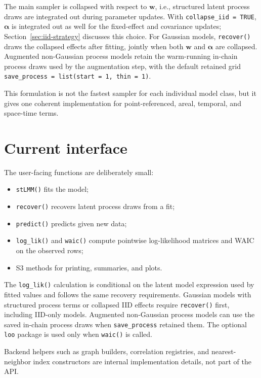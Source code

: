 \documentclass[11pt]{article}
\newcommand{\bw}{\bm{w}}
\newcommand{\balpha}{\bm{\alpha}}
\begin{document}
The main sampler is collapsed with respect to $\bw$, i.e., structured latent process draws are integrated out during parameter updates. With \texttt{collapse\_iid = TRUE}, $\balpha$ is integrated out as well for the fixed-effect and covariance updates; Section~\ref{sec:iid-strategy} discusses this choice. For Gaussian models, \texttt{recover()} draws the collapsed effects after fitting, jointly when both $\bw$ and $\balpha$ are collapsed. Augmented non-Gaussian process models retain the warm-running in-chain process draws used by the augmentation step, with the default retained grid \texttt{save\_process = list(start = 1, thin = 1)}.

This formulation is not the fastest sampler for each individual model class, but it gives one coherent implementation for point-referenced, areal, temporal, and space-time terms.

\section{Current interface}

The user-facing functions are deliberately small:
\begin{itemize}
\item \texttt{stLMM()} fits the model;
\item \texttt{recover()} recovers latent process draws from a fit;
\item \texttt{predict()} predicts given new data;
\item \texttt{log\_lik()} and \texttt{waic()} compute pointwise log-likelihood matrices and WAIC on the observed rows;
\item S3 methods for printing, summaries, and plots.
\end{itemize}

The \texttt{log\_lik()} calculation is conditional on the latent model expression used by fitted values and follows the same recovery requirements. Gaussian models with structured process terms or collapsed IID effects require \texttt{recover()} first, including IID-only models. Augmented non-Gaussian process models can use the saved in-chain process draws when \texttt{save\_process} retained them. The optional \texttt{loo} package is used only when \texttt{waic()} is called.

Backend helpers such as graph builders, correlation registries, and nearest-neighbor index constructors are internal implementation details, not part of the API.
\end{document}
